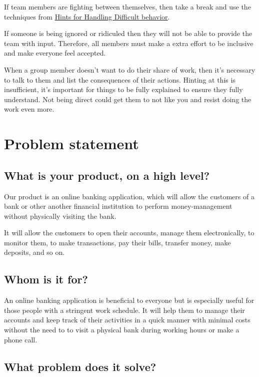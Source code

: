 \documentclass[
10pt, %
a4paper, %
oneside, %
headinclude,footinclude, %
BCOR5mm, %
]{scrartcl}
\begin{document}
If team members are fighting between themselves, then take a break and
use the techniques from
\protect\hyperlink{hints-for-handling-difficult-behavior}{Hints for
Handling Difficult behavior}.

If someone is being ignored or ridiculed then they will not be able to
provide the team with input. Therefore, all members must make a extra
effort to be inclusive and make everyone feel accepted.

When a group member doesn't want to do their share of work, then it's
necessary to talk to them and list the consequences of their actions.
Hinting at this is insufficient, it's important for things to be fully
explained to ensure they fully understand. Not being direct could get
them to not like you and resist doing the work even more.

\section{Problem statement}

\subsection{What is your product, on a high level?}

Our product is an online banking application, which will allow the
customers of a bank or other another financial institution to perform
money-management without physically visiting the bank.

It will allow the customers to open their accounts, manage them
electronically, to monitor them, to make transactions, pay their bills,
transfer money, make deposits, and so on.

\subsection{Whom is it for?}

An online banking application is beneficial to everyone but is
especially useful for those people with a stringent work schedule. It
will help them to manage their accounts and keep track of their
activities in a quick manner with minimal costs without the need to to
visit a physical bank during working hours or make a phone call.

\subsection{What problem does it
solve?}
\end{document}
